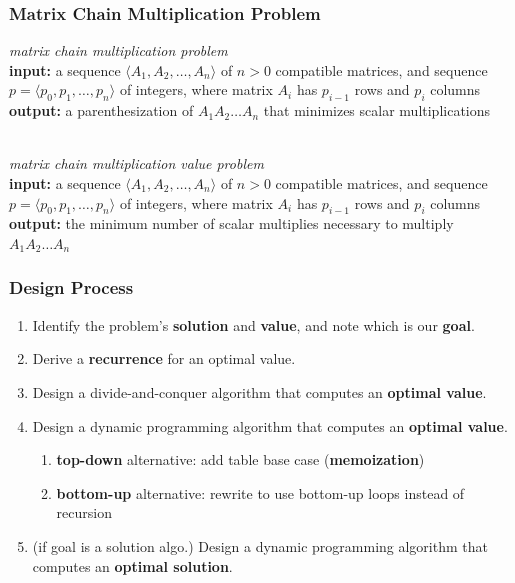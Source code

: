 \documentclass[10pt,aspectratio=169]{beamer}
\newcommand{\stanza}{ \\~\ }
\begin{document}
\begin{frame} \frametitle{Matrix Chain Multiplication Problem}
  \emph{matrix chain multiplication problem} \\
  \textbf{input:} a sequence $\langle A_1, A_2, \ldots, A_n \rangle$ of $n>0$ compatible matrices,
    and sequence $p=\langle p_0, p_1, \ldots, p_n \rangle$ of integers, where
    matrix $A_i$ has $p_{i-1}$ rows and $p_i$ columns \\
  \textbf{output:} a parenthesization of $A_1 A_2 \ldots A_n$ that minimizes scalar multiplications
  \stanza

  \emph{matrix chain multiplication value problem} \\
  \textbf{input:} a sequence $\langle A_1, A_2, \ldots, A_n \rangle$ of $n>0$ compatible matrices,
    and sequence $p=\langle p_0, p_1, \ldots, p_n \rangle$ of integers, where
    matrix $A_i$ has $p_{i-1}$ rows and $p_i$ columns \\
  \textbf{output:} the minimum number of scalar multiplies necessary to multiply $A_1 A_2 \ldots A_n$ 
\end{frame}

\begin{frame} \frametitle{Design Process}
  \begin{enumerate}
    \item Identify the problem's \textbf{solution} and \textbf{value}, and note which is our \textbf{goal}.
    \item Derive a \textbf{recurrence} for an optimal value.
    \item Design a divide-and-conquer algorithm that computes an \textbf{optimal value}.
    \item Design a dynamic programming algorithm that computes an \textbf{optimal value}.
    \begin{enumerate}
      \item \textbf{top-down} alternative: add table base case (\textbf{memoization})
      \item \textbf{bottom-up} alternative: rewrite to use bottom-up loops instead of recursion
    \end{enumerate}
    \item (if goal is a solution algo.) Design a dynamic programming algorithm that computes an \textbf{optimal solution}.
  \end{enumerate}
  \end{frame}
  
\end{document}
